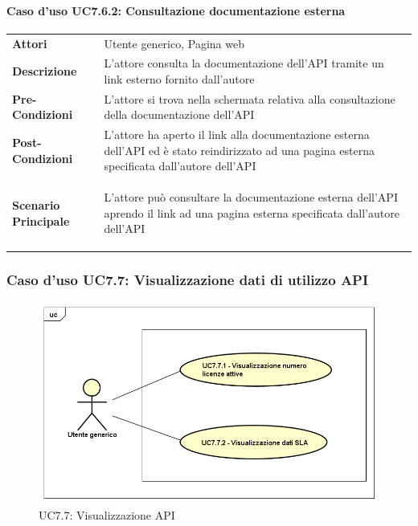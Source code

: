 \paragraph{Caso d'uso UC7.6.2: Consultazione documentazione esterna}
\label{UC7_6_2}

\begin{minipage}{\linewidth}
	\begin{tabular}{ l | p{11cm}}
		\hline
		\rowcolor{Gray}
		\multicolumn{2}{c}{UC7.6.2 - Consultazione documentazione esterna} \\
		\hline
		\textbf{Attori} & Utente generico, Pagina web \\
		\textbf{Descrizione} & L'attore consulta la documentazione dell'API tramite un link esterno fornito dall'autore \\
		\textbf{Pre-Condizioni} & L'attore si trova nella schermata relativa alla consultazione della documentazione dell'API \\
		\textbf{Post-Condizioni} & L'attore ha aperto il link alla documentazione esterna dell'API ed è stato reindirizzato ad una pagina esterna specificata dall'autore dell'API \\
		\textbf{Scenario Principale} & 
		\begin{enumerate*}[label=(\arabic*.),itemjoin={\newline}]
			\item L'attore può consultare la documentazione esterna dell'API aprendo il link ad una pagina esterna specificata dall'autore dell'API
		\end{enumerate*}\\
	\end{tabular}
\end{minipage}

\newpage
\subsubsection{Caso d'uso UC7.7: Visualizzazione dati di utilizzo API}
\label{UC7_7}
\begin{figure}[ht]
	\centering
	\includegraphics[scale=0.45]{UML/UC7_7.png}
	\caption{UC7.7: Visualizzazione API}
\end{figure}

